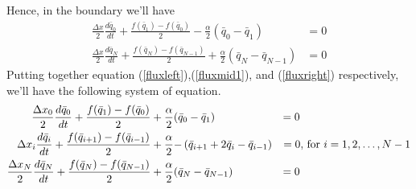 \documentclass{article}
\theoremstyle{definition}
\begin{document}
    Hence, in the boundary we'll have 
    \begin{align}
        \label{fluxleft}\frac{\Delta x}2 \frac{d\bar{{q}}_0}{dt} 
            + \frac{{f(\bar{{q}}_{1}) - f(\bar{{q}}_{0}) }}{2} 
            -  \frac{\alpha}2 {\left(\bar{{q}}_{0} - \bar{{q}}_1 \right)} &= 0\\
        \label{fluxright}\frac{\Delta x}2 \frac{d\bar{{q}}_N}{dt} 
        + \frac{f(\bar{{q}}_{N}) -f(\bar{{q}}_{N-1}) }{2} 
        + \frac{\alpha}2 {\left(\bar{{q}}_{N} - \bar{{q}}_{N-1} \right)} &=0 
    \end{align}
    Putting together equation (\ref{fluxleft}),(\ref{fluxmid1}), and (\ref{fluxright}) respectively, 
    we'll have the following system of equation. 
    \begin{align}
        \frac{\Delta x_0}{2} \frac{d\bar{{q}}_0}{dt} + \frac{f(\bar{{q}}_{1}) - f(\bar{{q}}_{0}) } 2
            &+  \frac{\alpha}2{\left(\bar{{q}}_{0} - \bar{{q}}_1 \right)}  &= 0 \ & \notag \\
        \Delta x_i \frac{d\bar{{q}}_i}{dt} + \frac{f(\bar{{q}}_{i+1}) -f(\bar{{q}}_{i-1}) }{2} 
            &+ \frac{\alpha}2 {-\left(\bar{{q}}_{i+1} + 2\bar{{q}}_i - \bar{{q}}_{i-1}\right)} &= 0, 
                &\textrm{ for }i=1,2,\dots,N-1 \notag \\
        \frac{\Delta x_N}2 \frac{d\bar{{q}}_N}{dt} 
            + \frac{f(\bar{{q}}_{N}) -f(\bar{{q}}_{N-1}) }2
            &+ \frac{\alpha}2 {\left(\bar{{q}}_{N} - \bar{{q}}_{N-1} \right)} &=0 \ \label{system1}&
    \end{align}

\end{document}
